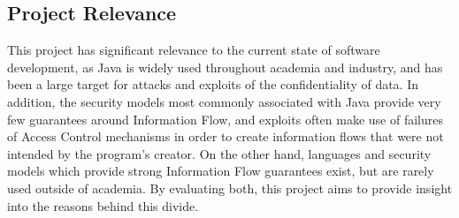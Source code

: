 \subsection{Project Relevance}

This project has significant relevance to the current state of software development, as Java is widely used throughout academia and industry, and has been a large target for attacks and exploits of the confidentiality of data. In addition, the security models most commonly associated with Java provide very few guarantees around Information Flow, and exploits often make use of failures of Access Control mechanisms in order to create information flows that were not intended by the program's creator. On the other hand, languages and security models which provide strong Information Flow guarantees exist, but are rarely used outside of academia. By evaluating both, this project aims to provide insight into the reasons behind this divide.